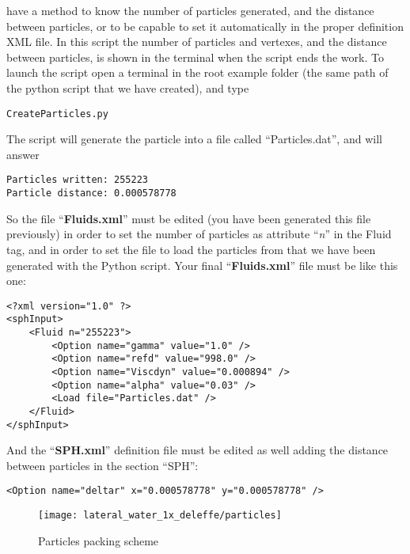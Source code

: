have a method to know the number of particles generated, and the distance between particles, or
to be capable to set it automatically in the proper definition XML file. In this script the
number of particles and vertexes, and the distance between particles, is shown in the terminal
when the script ends the work.\rc
%
To launch the script open a terminal in the root example folder (the same path of the python
script that we have created), and type
%
\begin{verbatim}
CreateParticles.py
\end{verbatim}
%
The script will generate the particle into a file called ``Particles.dat'', and will answer
%
\begin{verbatim}
Particles written: 255223
Particle distance: 0.000578778
\end{verbatim}
%
So the file ``\textbf{Fluids.xml}'' must be edited (you have been generated this file previously)
in order to set the number of particles as attribute ``\textit{n}'' in the Fluid tag, and in order
to set the file to load the particles from that we have been generated with the Python script. Your
final ``\textbf{Fluids.xml}'' file must be like this one:
%
\begin{verbatim}
<?xml version="1.0" ?>
<sphInput>
	<Fluid n="255223">
		<Option name="gamma" value="1.0" />
		<Option name="refd" value="998.0" />
		<Option name="Viscdyn" value="0.000894" />
		<Option name="alpha" value="0.03" />
		<Load file="Particles.dat" />
	</Fluid>
</sphInput>
\end{verbatim}
%
And the ``\textbf{SPH.xml}'' definition file must be edited as well adding the distance between
particles in the section ``SPH'':
%
\begin{verbatim}
<Option name="deltar" x="0.000578778" y="0.000578778" />  
\end{verbatim}
%
\begin{figure}[ht!]
  \centering
  \texttt{[image: lateral\_water\_1x\_deleffe/particles]}
  \caption{Particles packing scheme}
  \label{fig:examples:lateral_water_1x_deleffe:particles_packing}
\end{figure}
%

